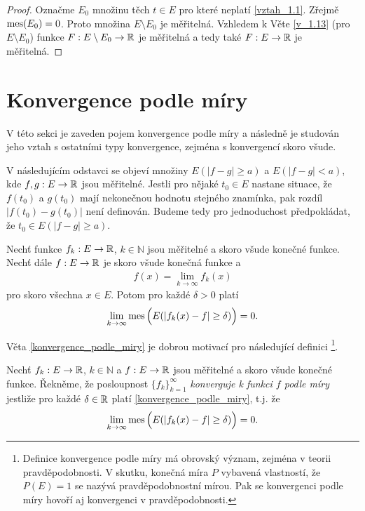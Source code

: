 \begin{proof}
Označme $E_0$ množinu těch $t \in E$ pro které neplatí \eqref{vztah_1.1}. 
Zřejmě $\operatorname{mes}(E_0)=0$. Proto množina $E \setminus E_0$ je měřitelná. Vzhledem k Věte \ref{v_1.13}
(pro $E \setminus E_0$) funkce $F:E \setminus E_0 \to \mathbb{R}$ je měřitelná a tedy také $F:E \to \mathbb{R}$ je měřitelná.
\end{proof}

\section{Konvergence podle míry}
V této sekci je zaveden pojem konvergence podle míry a následně je studován jeho vztah s ostatními typy konvergence, zejména s konvergencí skoro všude. 

\begin{umluva}
V následujícím odstavci se objeví množiny $E(|f-g| \geq a)$ a $E(|f-g|<a)$, kde $f,g: E \to \mathbb{R}$ jsou měřitelné. Jestli pro nějaké $t_0 \in E$ nastane situace, že $f(t_0)$ a $g(t_0)$ mají nekonečnou hodnotu stejného znamínka, pak rozdíl $|f(t_0)-g(t_0)|$ není definován.
Budeme tedy pro jednoduchost předpokládat, že $t_0 \in E(|f-g| \geq a)$.
\end{umluva}

\begin{theorem}[Lebesgue]
\label{konvergence_podle_miry}
Nechť funkce $f_k:E \to \mathbb{R}$, $k \in \mathbb{N}$ jsou měřitelné a skoro všude konečné funkce. Nechť dále $f:E \to \mathbb{R}$ je skoro všude konečná funkce a 
\begin{align*}
f(x)=\lim \limits _{k \to \infty} f_k(x)
\end{align*}
pro skoro všechna $x \in E$. Potom pro každé $\delta>0$ platí 
\begin{align}
\lim \limits _{k \to \infty} \operatorname{mes} \Big(E(|f_k(x)-f|\geq \delta)\Big)=0.
\end{align}
\end{theorem}

Věta \ref{konvergence_podle_miry} je dobrou motivací pro následující definici \footnote{Definice konvergence podle míry má obrovský význam, zejména v teorii pravděpodobnosti. V skutku, konečná míra $P$ vybavená vlastností, že $P(E)=1$ se nazývá pravděpodobnostní mírou. Pak se konvergenci podle míry hovoří aj konvergenci v pravděpodobnosti.}.


\begin{definition}
\label{d_1.15_konvergence_podle_miry}
Nechť $f_k:E \to \mathbb{R}$, $k \in \mathbb{N}$ a $f:E \to \mathbb{R}$ jsou měřitelné a skoro všude konečné funkce. Řekněme, že posloupnost $\{f_k\}_{k=1}^{\infty}$ \textit{konverguje k funkci $f$ podle míry} jestliže pro každé $\delta \in \mathbb{R}$ platí \ref{konvergence_podle_miry}, t.j. že
\begin{align*}
\lim \limits _{k \to \infty} \operatorname{mes} \Big(E(|f_k(x)-f|\geq \delta)\Big)=0.
\end{align*}

\end{definition}

